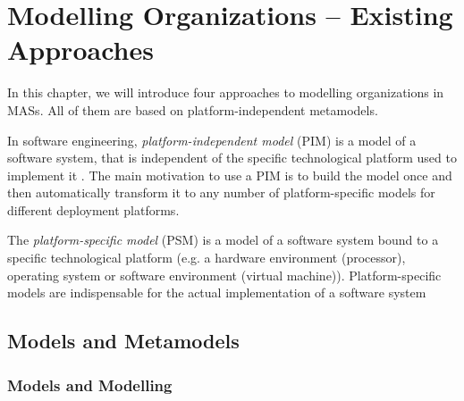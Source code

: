 
\chapter{Modelling Organizations -- Existing Approaches}

In this chapter, we will introduce four approaches to modelling organizations in MASs.
All of them are based on platform-independent metamodels.

In software engineering, \textit{platform-independent model} (PIM) is a model of a software system, that is independent of the specific technological platform used to implement it \cite{Wikipedia-PIM}.
The main motivation to use a PIM is to build the model once and then automatically transform it to any number of platform-specific models for different deployment platforms.

The \textit{platform-specific model} (PSM) is a model of a software system bound to a specific technological platform (e.g. a hardware environment (processor), operating system or software environment (virtual machine)).
Platform-specific models are indispensable for the actual implementation of a software system \cite{Wikipedia-PSM}

\section{Models and Metamodels}

\subsection{Models and Modelling}

